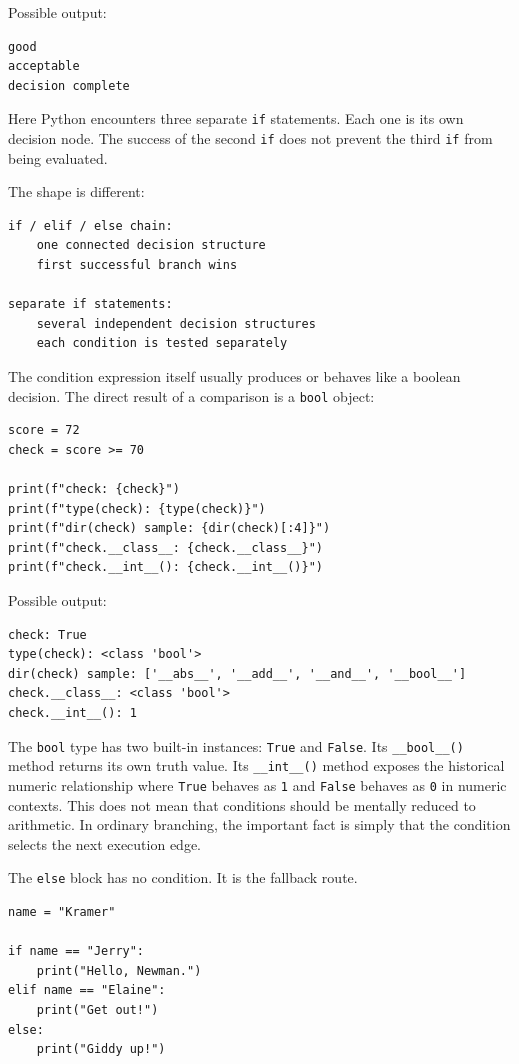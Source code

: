 Possible output:

\begin{verbatim}
good
acceptable
decision complete
\end{verbatim}

Here Python encounters three separate \texttt{if} statements. Each one is its own decision node. The success of the second \texttt{if} does not prevent the third \texttt{if} from being evaluated.

The shape is different:

\begin{verbatim}
if / elif / else chain:
    one connected decision structure
    first successful branch wins

separate if statements:
    several independent decision structures
    each condition is tested separately
\end{verbatim}

The condition expression itself usually produces or behaves like a boolean decision. The direct result of a comparison is a \texttt{bool} object:

\begin{verbatim}
score = 72
check = score >= 70

print(f"check: {check}")
print(f"type(check): {type(check)}")
print(f"dir(check) sample: {dir(check)[:4]}")
print(f"check.__class__: {check.__class__}")
print(f"check.__int__(): {check.__int__()}")
\end{verbatim}

Possible output:

\begin{verbatim}
check: True
type(check): <class 'bool'>
dir(check) sample: ['__abs__', '__add__', '__and__', '__bool__']
check.__class__: <class 'bool'>
check.__int__(): 1
\end{verbatim}

The \texttt{bool} type has two built-in instances: \texttt{True} and \texttt{False}. Its \texttt{\_\_bool\_\_()} method returns its own truth value. Its \texttt{\_\_int\_\_()} method exposes the historical numeric relationship where \texttt{True} behaves as \texttt{1} and \texttt{False} behaves as \texttt{0} in numeric contexts. This does not mean that conditions should be mentally reduced to arithmetic. In ordinary branching, the important fact is simply that the condition selects the next execution edge.

The \texttt{else} block has no condition. It is the fallback route.

\begin{verbatim}
name = "Kramer"

if name == "Jerry":
    print("Hello, Newman.")
elif name == "Elaine":
    print("Get out!")
else:
    print("Giddy up!")
\end{verbatim}

